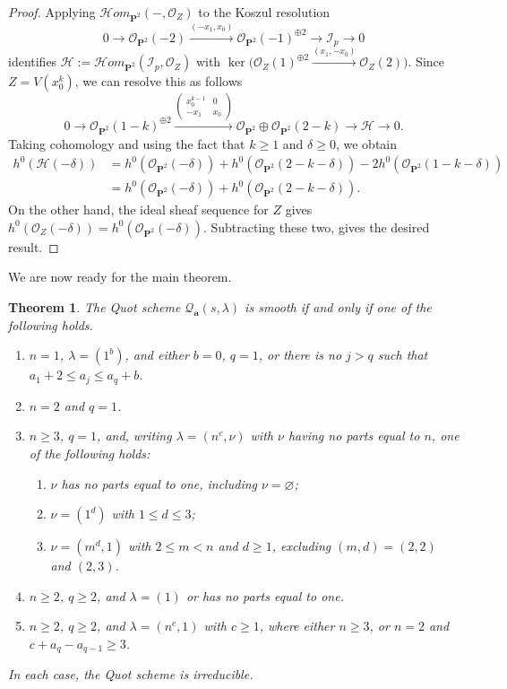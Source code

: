\documentclass[leqno,11pt,a4paper]{amsart}
\newtheorem{thm}{Theorem}[section]
\theoremstyle{definition}
\numberwithin{equation}{section}
\newcommand{\bfa}{\mathbf{a}}
\newcommand{\PP}{\mathbf{P}}
\newcommand{\OO}{\mathscr{O}}
\newcommand{\II}{\mathscr{I}}
\newcommand{\HH}{\mathcal{H}}
\newcommand{\QQ}{\mathcal{Q}}
\begin{document}
\begin{proof}
Applying $\HH om_{\PP^2}(-,\OO_Z)$ to the Koszul resolution
$$
0\longrightarrow\OO_{\PP^2}(-2)
\xrightarrow{(-x_1,x_0)}
\OO_{\PP^2}(-1)^{\oplus2}
\longrightarrow\II_p\longrightarrow0
$$
identifies $\mathscr H:=\mathcal Hom_{\PP^2}(\II_p,\OO_Z)$ with $\ker\bigl(\OO_Z(1)^{\oplus2} \xrightarrow{(x_1,-x_0)}\OO_Z(2)\bigr)$.
Since $Z=V(x_0^k)$, we can resolve this as follows
$$
0\longrightarrow\OO_{\PP^2}(1-k)^{\oplus2}
\xrightarrow{
\begin{pmatrix}
x_0^{k-1}&0\\
-x_1&x_0
\end{pmatrix}}
\OO_{\PP^2}\oplus\OO_{\PP^2}(2-k)
\longrightarrow\mathscr H\longrightarrow0.
$$
Taking cohomology and using the fact that $k\geq 1$ and $\delta \geq 0$, we obtain
\begin{align*}
h^0(\mathscr H(-\delta))  & = h^0(\OO_{\PP^2}(-\delta)) +h^0(\OO_{\PP^2}(2-k-\delta)) -2h^0(\OO_{\PP^2}(1-k-\delta)) \\
& = h^0(\OO_{\PP^2}(-\delta)) +h^0(\OO_{\PP^2}(2-k-\delta)).
\end{align*}
On the other hand, the ideal sheaf sequence for $Z$ gives  $h^0(\OO_Z(-\delta))=h^0(\OO_{\PP^2}(-\delta))$.
Subtracting these two, gives the desired result.
\end{proof}


We are now ready for the main theorem.


\begin{thm}\label{smooth_quot_classification}
The Quot scheme $\QQ_{\bfa}(s,\lambda)$ is smooth if and only if one of the following holds.
\begin{enumerate}
\item $n=1$, $\lambda=(1^b)$, and either $b=0$, $q=1$, or there is no
$j>q$ such that $a_1+2\leq a_j\leq a_q+b$.
\item $n=2$ and $q=1$.
\item $n\geq3$, $q=1$, and, writing $\lambda=(n^c,\nu)$ with $\nu$ having no parts equal to $n$, one of the following holds:
\begin{enumerate}
\item $\nu$ has no parts equal to one, including $\nu=\varnothing$;
\item $\nu=(1^d)$ with $1\leq d\leq3$;
\item $\nu=(m^d,1)$ with $2\leq m<n$ and $d\geq1$, excluding
$(m,d)=(2,2)$ and $(2,3)$.
\end{enumerate}
\item $n\geq2$, $q\geq2$, and $\lambda = (1)$ or has no parts equal to one.
\item $n\geq2$, $q\geq2$, and $\lambda=(n^c,1)$ with $c\geq1$, where either $n\geq3$, or $n=2$ and $c+a_q-a_{q-1}\geq3$.
\end{enumerate}
In each case, the Quot scheme is irreducible.
\end{thm}
\end{document}
